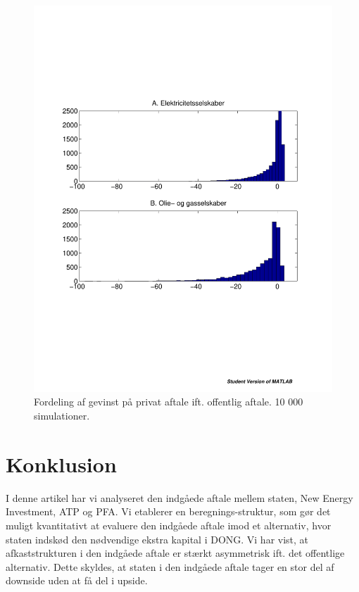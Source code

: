 \documentclass{article}
\begin{document}
\begin{figure}
\includegraphics[scale=0.8]{../matlab/figs/sim_return.pdf}
\caption{Fordeling af gevinst på privat aftale ift. offentlig aftale. 10 000 simulationer. }
\label{fig:sim}
\end{figure}




\section{Konklusion}

I denne artikel har vi analyseret den indgåede aftale mellem staten, New Energy Investment, ATP og PFA. Vi etablerer en beregnings-struktur, som gør det muligt kvantitativt at evaluere den indgåede aftale imod et alternativ, hvor staten indskød den nødvendige ekstra kapital i DONG. Vi har vist, at afkaststrukturen i den indgåede aftale er stærkt asymmetrisk ift. det offentlige alternativ. Dette skyldes, at staten i den indgåede aftale tager en stor del af downside uden at få del i upside. 
\end{document}
